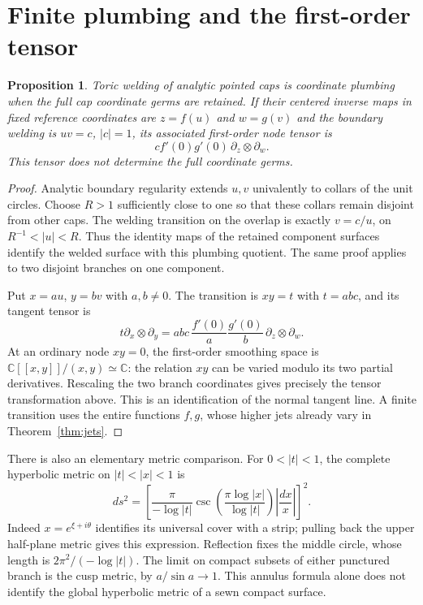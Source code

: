 \documentclass[11pt,a4paper]{article}
\newtheorem{proposition}[theorem]{Proposition}
\theoremstyle{definition}
\newcommand{\C}{\mathbb C}
\begin{document}
\section{Finite plumbing and the first-order tensor}
\begin{proposition}\label{prop:plumbing}
Toric welding of analytic pointed caps is coordinate plumbing when the full cap coordinate germs are retained. If their centered inverse maps in fixed reference coordinates are $z=f(u)$ and $w=g(v)$ and the boundary welding is $uv=c$, $|c|=1$, its associated first-order node tensor is
\[
 c f'(0)g'(0)\,\partial_z\otimes\partial_w.
\]
This tensor does not determine the full coordinate germs.
\end{proposition}
\begin{proof}
Analytic boundary regularity extends $u,v$ univalently to collars of the unit circles. Choose $R>1$ sufficiently close to one so that these collars remain disjoint from other caps. The welding transition on the overlap is exactly $v=c/u$, on $R^{-1}<|u|<R$. Thus the identity maps of the retained component surfaces identify the welded surface with this plumbing quotient. The same proof applies to two disjoint branches on one component.

Put $x=au$, $y=bv$ with $a,b\ne0$. The transition is $xy=t$ with $t=abc$, and its tangent tensor is
\[
 t\partial_x\otimes\partial_y
 =abc\,\frac{f'(0)}a\frac{g'(0)}b\,
       \partial_z\otimes\partial_w.
\]
At an ordinary node $xy=0$, the first-order smoothing space is $\C[[x,y]]/(x,y)\simeq\C$: the relation $xy$ can be varied modulo its two partial derivatives. Rescaling the two branch coordinates gives precisely the tensor transformation above. This is an identification of the normal tangent line. A finite transition uses the entire functions $f,g$, whose higher jets already vary in Theorem~\ref{thm:jets}.
\end{proof}

There is also an elementary metric comparison. For $0<|t|<1$, the complete hyperbolic metric on $|t|<|x|<1$ is
\[
 ds^2=\left[\frac{\pi}{-\log|t|}
 \csc\!\left(\frac{\pi\log|x|}{\log|t|}\right)
 \left|\frac{dx}{x}\right|\right]^2.
\]
Indeed $x=e^{\xi+i\theta}$ identifies its universal cover with a strip; pulling back the upper half-plane metric gives this expression. Reflection fixes the middle circle, whose length is $2\pi^2/(-\log|t|)$. The limit on compact subsets of either punctured branch is the cusp metric, by $a/\sin a\to1$. This annulus formula alone does not identify the global hyperbolic metric of a sewn compact surface.
\end{document}
